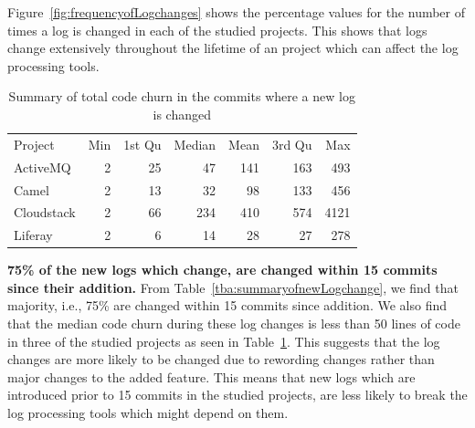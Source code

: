 Figure~\ref{fig:frequencyofLogchanges} shows the percentage values for the number of times a log is changed in each of the studied projects. This shows that logs change extensively throughout the lifetime of an project which can affect the log processing tools.

\begin{table}[t]
	\centering
	\caption{Summary of total code churn in the commits where a new log is changed}
	
	\begin{tabular}{lrrrrrr}
		\cline{1-7}
		Project    & Min & 1st Qu & Median & Mean & 3rd Qu & Max \\
		\cline{1-7}
		ActiveMQ   & 2  & 25      & 47     & 141    & 163     & 493  \\
		Camel      & 2   & 13      & 32      & 98    & 133      & 456 \\
		Cloudstack & 2   & 66      & 234      & 410   & 574     & 4121 \\
		Liferay    & 2   & 6      & 14     & 28    & 27     & 278\\	\cline{1-7}
		
	\end{tabular}
	\label{tba:summaryofnewLogCodechange}
\end{table}




\textbf{75\% of the new logs which change, are changed within 15 commits since their addition.} From Table~\ref{tba:summaryofnewLogchange}, we find that majority, i.e., 75\% are changed within 15 commits since addition.  We also find that the median code churn during these log changes is less than 50 lines of code in three of the studied projects as seen in Table~\ref{tba:summaryofnewLogCodechange}. This suggests that the log changes are more likely to be changed due to rewording changes rather than major changes to the added feature. This means that new logs which are introduced prior to 15 commits in the studied projects, are less likely to break the log processing tools which might depend on them. 




